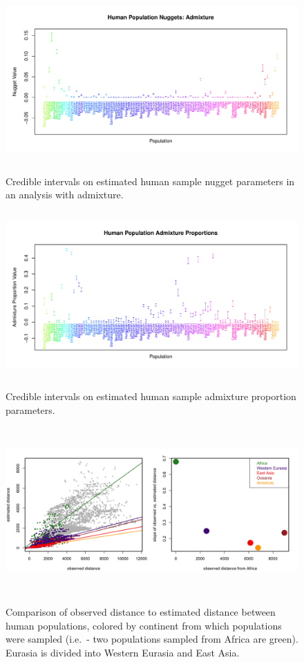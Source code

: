 \documentclass[12pt]{article}
\begin{document}
\begin{figure}
\centering
	{\includegraphics[width=5in,height=2.5in]{figs/globetrotter/globe_Ad_nugget.pdf}}
	\caption{Credible intervals on estimated human sample nugget parameters in an analysis with admixture.}\label{sfig:globe_ad_nugg}
\end{figure}

\clearpage

\begin{figure}
\centering
	{\includegraphics[width=5in,height=2.5in]{figs/globetrotter/globe_adprop.pdf}}
	\caption{Credible intervals on estimated human sample admixture proportion parameters.}\label{sfig:globe_adprops}
\end{figure}

\clearpage

\begin{figure}
	\centering
		{\includegraphics[width=6in,height=2.5in]{figs/globetrotter/globe_NoAd_dist_decay.png}}
	\caption{Comparison of observed distance to estimated distance between human populations, colored by continent from which populations were sampled (i.e.\ - two populations sampled from Africa are green).  Eurasia is divided into Western Eurasia and East Asia.}
\label{sfig:globe_noad_distcomp}
\end{figure}
\end{document}
